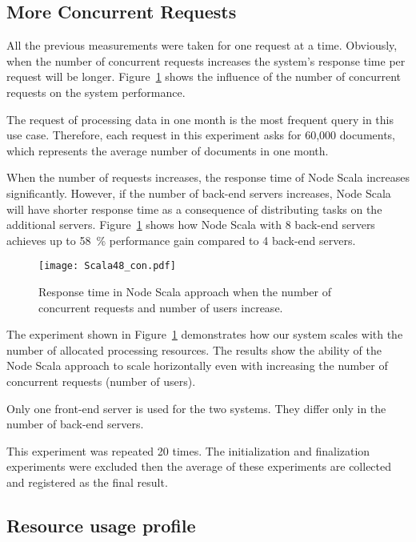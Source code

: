 \documentclass[10pt,conference,letterpaper]{IEEEtran}
\begin{document}
\subsection{More Concurrent Requests}

All the previous measurements were taken for one request at a
time. Obviously, when the number of concurrent requests increases the
system's response time per request will be
longer. Figure~\ref{fig:Scala48_con} shows the influence of the number
of concurrent requests on the system performance.

The request of processing data in one month is the most frequent query
in this use case. Therefore, each request in this experiment asks for
60,000 documents, which represents the average number of documents in
one month.

When the number of requests increases, the response time of Node Scala
increases significantly. However, if the number of back-end servers
increases, Node Scala will have shorter response time as a consequence
of distributing tasks on the additional
servers. Figure~\ref{fig:Scala48_con} shows how Node Scala with 8
back-end servers achieves up to 58~\% performance gain compared to 4
back-end servers.

\begin{figure}
  \centering
    \texttt{[image: Scala48\_con.pdf]}
  \caption{Response time in Node Scala approach when the number of concurrent requests and number of users increase.}
  \label{fig:Scala48_con}
\end{figure}

The experiment shown in Figure~\ref{fig:Scala48_con} demonstrates how
our system scales with the number of allocated processing
resources. The results show the ability of the Node Scala approach to
scale horizontally even with increasing the number of concurrent
requests (number of users).

Only one front-end server is used for the two systems. They differ
only in the number of back-end servers.

This experiment was repeated 20 times. The initialization and
finalization experiments were excluded then the average of these
experiments are collected and registered as the final result.

\subsection{Resource usage profile}
\end{document}
